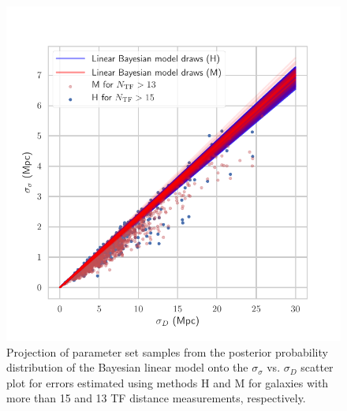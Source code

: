 \documentclass[a4paper,fleqn,usenatbib]{mnras}
\begin{document}
\begin{figure}
	\includegraphics[scale=0.7]{drawsee}
    \caption{Projection of parameter set samples from the posterior probability distribution of the Bayesian linear model onto the $\sigma_\sigma$ vs. $\sigma_D$ scatter plot for errors estimated using methods H and M for galaxies with more than 15 and 13 TF distance measurements, respectively.}
    \label{fig:drawsee}
\end{figure}
\end{document}
